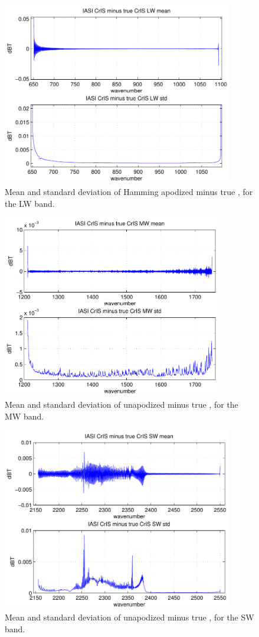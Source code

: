 \documentclass[12pt]{article}
\begin{document}
\begin{figure}
  \centering
  \includegraphics[height=8cm]{figures/iasi_cris_lw_2.pdf}
  \caption{Mean and standard deviation of Hamming apodized {\iasi}
    {\cris} minus true {\cris}, for the {\cris} LW band. }
  \label{iclw2}
\end{figure}

\begin{figure}
  \centering
  \includegraphics[height=8cm]{figures/iasi_cris_mw_1.pdf}
  \caption{Mean and standard deviation of unapodized {\iasi} {\cris}
    minus true {\cris}, for the {\cris} MW band.}
  \label{icmw1}
\end{figure}

\begin{figure}
  \centering
  \includegraphics[height=8cm]{figures/iasi_cris_sw_1.pdf}
  \caption{Mean and standard deviation of unapodized {\iasi} {\cris}
    minus true {\cris}, for the {\cris} SW band.}
  \label{icsw1}
\end{figure}
\end{document}
